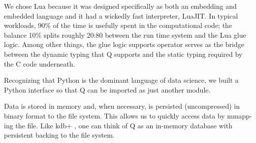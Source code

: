 We chose Lua
because it was designed specifically as both an embedding and embedded language
\cite{Lua2011,Lua2018} and it had a wickedly fast interpreter, LuaJIT. 
In typical workloads, 90\% of the time is usefully spent in the computational
code; the balance 10\% splits roughly 20:80 between the
run time system and the Lua glue logic. Among other things, the glue logic
supports operator serves as the bridge between the dynamic typing that Q
supports and the static typing required by the C code underneath.

Recognizing that Python is the dominant language of data science, we built a
Python interface so that Q can be imported as just another module.

Data is stored in memory and, when necessary, is persisted (uncompressed) in
binary format to the file system. This allows us to quickly access data by
mmapp-ing the file.  Like kdb+ \cite{Borror2015}, one can think of Q as 
an in-memory database with persistent backing to the file system.





